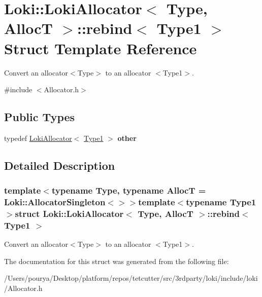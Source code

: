 \hypertarget{structLoki_1_1LokiAllocator_1_1rebind}{}\section{Loki\+:\+:Loki\+Allocator$<$ Type, Alloc\+T $>$\+:\+:rebind$<$ Type1 $>$ Struct Template Reference}
\label{structLoki_1_1LokiAllocator_1_1rebind}


Convert an allocator$<$\+Type$>$ to an allocator $<$\+Type1$>$.  




{\ttfamily \#include $<$Allocator.\+h$>$}

\subsection*{Public Types}
\begin{DoxyCompactItemize}
\item 
\hypertarget{structLoki_1_1LokiAllocator_1_1rebind_aa51ea40e0b0e18826123ed766a5b7631}{}typedef \hyperlink{classLoki_1_1LokiAllocator}{Loki\+Allocator}$<$ \hyperlink{classType1}{Type1} $>$ {\bfseries other}\label{structLoki_1_1LokiAllocator_1_1rebind_aa51ea40e0b0e18826123ed766a5b7631}

\end{DoxyCompactItemize}


\subsection{Detailed Description}
\subsubsection*{template$<$typename Type, typename Alloc\+T = Loki\+::\+Allocator\+Singleton$<$$>$$>$template$<$typename Type1$>$struct Loki\+::\+Loki\+Allocator$<$ Type, Alloc\+T $>$\+::rebind$<$ Type1 $>$}

Convert an allocator$<$\+Type$>$ to an allocator $<$\+Type1$>$. 

The documentation for this struct was generated from the following file\+:\begin{DoxyCompactItemize}
\item 
/\+Users/pourya/\+Desktop/platform/repos/tetcutter/src/3rdparty/loki/include/loki/Allocator.\+h\end{DoxyCompactItemize}
